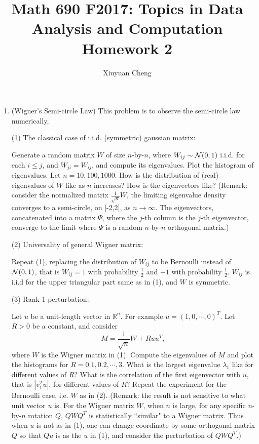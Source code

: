 \documentclass[english]{article}
\newcommand{\R}{\mathbb{R}}
\begin{document}
\title{Math 690 F2017: Topics in Data Analysis and Computation\\
Homework 2}

\author{Xiuyuan Cheng}

\date{}

\maketitle

\begin{enumerate}

\item
(Wigner's Semi-circle Law)
This problem is to observe the semi-circle law numerically,

(1) The classical case of  i.i.d. (symmetric) gaussian matrix: 

Generate a random matrix $W$ of size $n$-by-$n$, where $W_{ij} \sim {\cal N}(0, 1)$  i.i.d. for each $i \le j$, and $W_{ji} = W_{ij}$, and compute its eigenvalues. Plot the histogram of eigenvalues. Let $n=10,100,1000$. 
How is the distribution of (real) eigenvalues of $W$ like as $n$ increases?
How is the eigenvectors like?
(Remark: consider the normalized matrix $\frac{1}{\sqrt{n}}W$, the limiting eigenvalue density converges to a semi-circle, on [-2,2], as $n\to \infty$.
The eigenvectors, concatenated into a matrix $\Psi$, where the $j$-th column is the $j$-th eigenvector, converge to the limit where $\Psi$ is a random $n$-by-$n$ orthogonal matrix.)

(2) Universality of general Wigner matrix: 

Repeat (1), replacing the distribution of $W_{ij}$ to be Bernoulli instead of  ${\cal N}(0, 1)$, that is $W_{ij} = 1$ with probability $\frac{1}{2}$ and $-1$ with probability $\frac{1}{2}$. 
$W_{ij}$ is i.i.d for the upper triangular part same as in (1), and $W$ is symmetric.

(3) Rank-1 perturbation:

Let $u$ be a unit-length vector in $\R^n$. For example $u=(1,0,\cdots,0)^T$. Let $R>0$ be  a constant, and consider 
\[
M = \frac{1}{\sqrt{n}}W + R u u^T,
\]
where $W$ is the Wigner matrix in (1). 
Compute the eigenvalues of $M$ and plot the histograms for $R=0.1, 0.2, \cdots, 3$.
What is the largest eigenvalue $\lambda_1$ like for different values of $R$?
What is the correlation of the first eigenvector with $u$, that is $|v_1^T u|$,  for different values of $R$?
Repeat the experiment for the Bernoulli case, i.e. $W$ as in (2).
(Remark: the result is not sensitive to what unit vector $u$ is. For the Wigner matrix $W$, when $n$ is large, for any specific $n$-by-$n$ rotation $Q$, $QWQ^T$ is statistically ``similar" to a Wigner matrix. Thus when $u$ is not as in (1), one can change coordinate by some orthogonal matrix $Q$ so that $Qu$ is as the $u$ in (1), and consider the perturbation of $QWQ^T$.)


\end{enumerate}
\end{document}
